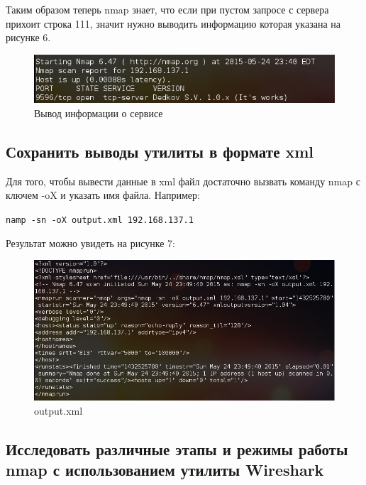 \documentclass[11pt, a4paper]{article}		%
\begin{document}
Таким образом теперь nmap знает, что если при пустом запросе с сервера прихоит строка 111, значит нужно выводить информацию которая указана на рисунке 6.

\begin{figure}[h!]
\centering
\includegraphics[scale=0.75]{res/server_response}
\caption{Вывод информации о сервисе}
\end{figure}




\subsection{Сохранить выводы утилиты в формате xml}

Для того, чтобы вывести данные в xml файл достаточно вызвать команду nmap с ключем -oX и указать имя файла. Например: 

\verb'namp -sn -oX output.xml 192.168.137.1'

Результат можно увидеть на рисунке 7:

\begin{figure}[h!]
\centering
\includegraphics[scale=0.75]{res/xml_output}
\caption{output.xml}
\end{figure}


\subsection{Исследовать различные этапы и режимы работы nmap с использованием утилиты Wireshark}
\end{document}
